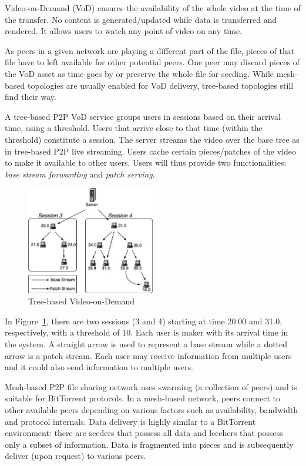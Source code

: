 Video-on-Demand (VoD) ensures the availability of the whole video at the time
of the transfer. No content is generated/updated while data is transferred and
rendered. It allows users to watch any point of video on any time.

As peers in a given network are playing a different part of the file, pieces
of that file have to left available for other potential peers. One peer may
discard pieces of the VoD asset as time goes by or preserve the whole file for
seeding. While mesh-based topologies are usually enabled for VoD delivery,
tree-based topologies still find their way.

A tree-based P2P VoD service groups users in sessions based on their arrival
time, using a threshold. Users that arrive close to that time (within the
threshold) constitute a session. The server streams the video over the base
tree as in tree-based P2P live streaming. Users cache certain pieces/patches
of the video to make it available to other users. Users will thus provide two
functionalities: \textit{base stream forwarding} and \textit{patch serving}.

\begin{figure}
  \centering
  \includegraphics[width=0.5\textwidth]{src/img/p2p-systems/tree-based-vod}
  \caption{Tree-based Video-on-Demand}
  \label{fig:p2p-systems:tree-based-vod}
\end{figure}

In Figure~\ref{fig:p2p-systems:tree-based-vod}, there are two sessions (3 and 4) starting
at time 20.00 and
31.0, respectively, with a threshold of 10. Each user is maker with its
arrival time in the system. A straight arrow is used to represent a base
stream while a dotted arrow is a patch stream. Each user may receive
information from multiple users and it could also send information to multiple
users.

Mesh-based P2P file sharing network uses swarming (a collection of peers) and
is suitable for BitTorrent protocols. In a mesh-based network, peers connect
to other available peers depending on various factors such as availability,
bandwidth and protocol internals. Data delivery is highly similar to a
BitTorrent environment: there are seeders that possess all data and leechers
that possess only a subset of information. Data is fragmented into pieces and
is subsequently deliver (upon request) to various peers.

